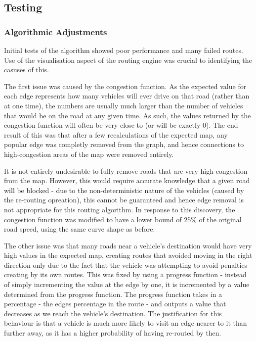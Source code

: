 \documentclass[ %
                    author={Alexander Hill},
                supervisor={Dr. Benjamin Sach},
                    degree={MEng},
                     title={MARMOSET},
                  subtitle={Multi-Agent Route Management using Online Simulation for Efficient Transportation},
                      type={research},
                      year={2016} ]{dissertation}
\begin{document}
\subsection{Testing}

\subsubsection{Algorithmic Adjustments}

Initial tests of the algorithm showed poor performance and many failed routes.
Use of the visualisation aspect of the routing engine was crucial to identifying
the casuses of this.

The first issue was caused by the congestion function. As the expected value
for each edge represents how many vehicles will ever drive on that road (rather
than at one time), the numbers are usually much larger than the number of
vehicles that would be on the road at any given time. As such, the values
returned by the congestion function will often be very close to (or will be
exactly 0). The end result of this was that after a few recalculations of the
expected map, any popular edge was completly removed from the graph, and hence
connections to high-congestion areas of the map were removed entirely.

It is not entirely undesirable to fully remove roads that are very high
congestion from the map. However, this would require accurate knowledge that a
given road will be blocked - due to the non-deterministic nature of the vehicles
(caused by the re-routing opreation), this cannot be guaranteed and hence edge
removal is not appropriate for this routing algorithm. In response to this
discovery, the congestion function was modified to have a lower bound of 25\% of
the original road speed, using the same curve shape as before.

The other issue was that many roads near a vehicle's destination would have very
high values in the expected map, creating routes that avoided moving in the
right direction only due to the fact that the vehicle was attempting to avoid
penalties creating by its own routes. This was fixed by using a progress
function - instead of simply incrementing the value at the edge by one, it is
incremented by a value determined from the progress function. The progress
function takes in a percentage - the edges percentage in the route - and outputs
a value that decreases as we reach the vehicle's destination. The justification
for this behaviour is that a vehicle is much more likely to visit an edge
nearer to it than further away, as it has a higher probability of having
re-routed by then.
\end{document}
